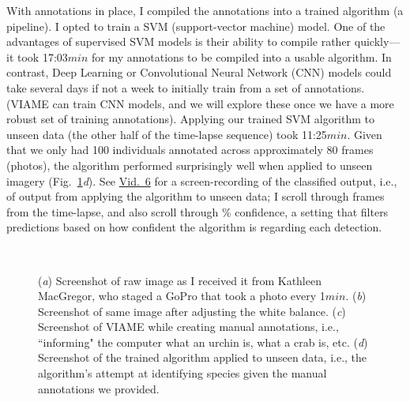 \documentclass[11pt]{article}
\begin{document}
With annotations in place, I compiled the annotations into a trained 
algorithm (a pipeline).
I opted to train a SVM (support-vector machine) model. 
One of the advantages of supervised SVM models is their ability to 
compile rather quickly---it took 17:03$min$ for my annotations to be 
compiled into a usable algorithm.
In contrast, Deep Learning or Convolutional Neural Network (CNN) models 
could take several days if not a week to initially train from a set of 
annotations.
(VIAME can train CNN models, and we will explore these 
once we have a more robust set of training annotations).  
Applying our trained SVM algorithm to unseen data (the other half of 
the time-lapse sequence) took 11:25$min$.
Given that we only had 100 individuals annotated across approximately 
80 frames (photos), the algorithm performed surprisingly well when 
applied to unseen imagery (Fig.~\ref{VIAME}\textit{d}).
See 
\href{https://drive.google.com/file/d/19CX6PiMXqZJvxj-YfzpFJOQLl5WSqlta/view?usp=sharing}{Vid.~6}
for a screen-recording of the classified output, i.e., of output from 
applying the algorithm to unseen data;
I scroll through frames from the time-lapse, and also scroll through \% 
confidence, a setting that filters predictions based on how confident 
the algorithm is regarding each detection. 

\begin{figure}[h!]
\centering
{}
\\
\caption{
(\textit{a}) Screenshot of raw image as I received it from Kathleen 
MacGregor, who staged a GoPro that took a photo every 1$min$.
(\textit{b}) Screenshot of same image after adjusting the white 
balance. 
(\textit{c}) Screenshot of VIAME while creating manual annotations, 
i.e., ``informing" the computer what an urchin is, what a crab is, etc.
(\textit{d}) Screenshot of the trained algorithm applied to unseen 
data, i.e., the algorithm's attempt at identifying species given the 
manual annotations we provided. 
}
\label{VIAME}
\end{figure}
\end{document}
